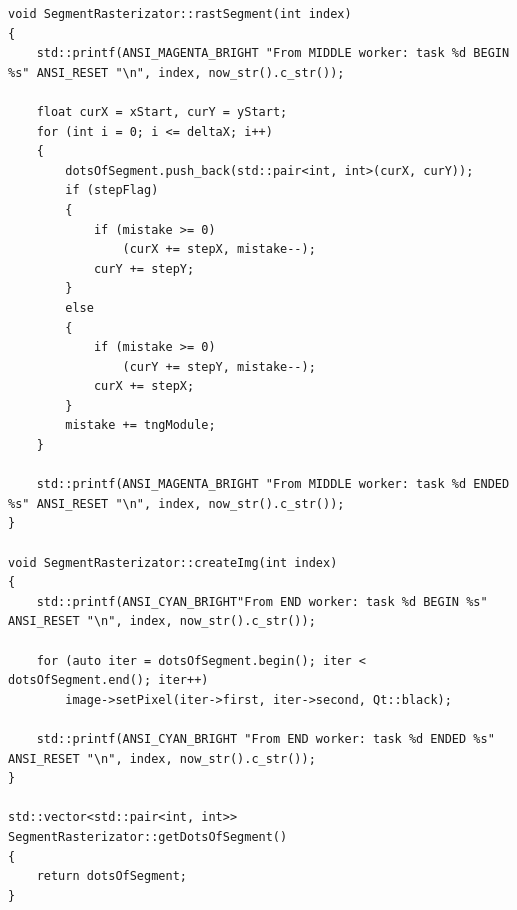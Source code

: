 \documentclass[12pt]{report}
\begin{document}
\begin{lstlisting}[caption=Разбиение алгоритма Брезенхема,
label={list:bresAlg}]
void SegmentRasterizator::rastSegment(int index)
{
    std::printf(ANSI_MAGENTA_BRIGHT "From MIDDLE worker: task %d BEGIN %s" ANSI_RESET "\n", index, now_str().c_str());

    float curX = xStart, curY = yStart;
    for (int i = 0; i <= deltaX; i++)
    {
        dotsOfSegment.push_back(std::pair<int, int>(curX, curY));
        if (stepFlag)
        {
            if (mistake >= 0)
                (curX += stepX, mistake--);
            curY += stepY;
        }
        else
        {
            if (mistake >= 0)
                (curY += stepY, mistake--);
            curX += stepX;
        }
        mistake += tngModule;
    }

    std::printf(ANSI_MAGENTA_BRIGHT "From MIDDLE worker: task %d ENDED %s" ANSI_RESET "\n", index, now_str().c_str());
}

void SegmentRasterizator::createImg(int index)
{
    std::printf(ANSI_CYAN_BRIGHT"From END worker: task %d BEGIN %s" ANSI_RESET "\n", index, now_str().c_str());

    for (auto iter = dotsOfSegment.begin(); iter < dotsOfSegment.end(); iter++)
        image->setPixel(iter->first, iter->second, Qt::black);

    std::printf(ANSI_CYAN_BRIGHT "From END worker: task %d ENDED %s" ANSI_RESET "\n", index, now_str().c_str());
}

std::vector<std::pair<int, int>> SegmentRasterizator::getDotsOfSegment()
{
    return dotsOfSegment;
}
\end{lstlisting}
\end{document}
